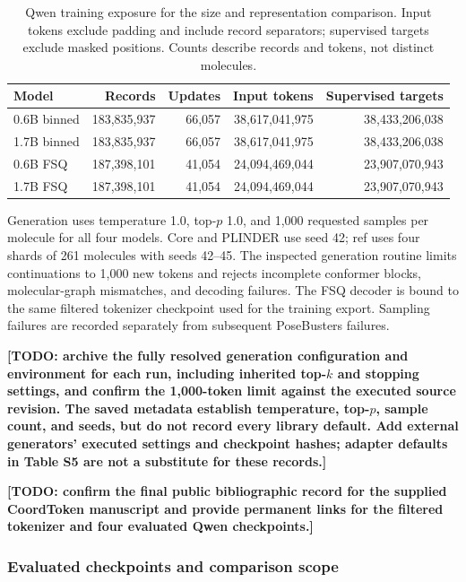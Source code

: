 \begin{table}[htbp]
\centering
\small
\setlength{\tabcolsep}{5pt}
\caption{Qwen training exposure for the size and representation comparison. Input tokens exclude padding and include record separators;
supervised targets exclude masked positions. Counts describe records and tokens,
not distinct molecules.}
\label{tab:qwen-training}
\begin{tabular}{lrrrr}
\toprule
Model & Records & Updates & Input tokens & Supervised targets \\
\midrule
0.6B binned & 183,835,937 & 66,057 & 38,617,041,975 & 38,433,206,038 \\
1.7B binned & 183,835,937 & 66,057 & 38,617,041,975 & 38,433,206,038 \\
0.6B FSQ & 187,398,101 & 41,054 & 24,094,469,044 & 23,907,070,943 \\
1.7B FSQ & 187,398,101 & 41,054 & 24,094,469,044 & 23,907,070,943 \\
\bottomrule
\end{tabular}
\end{table}

Generation uses temperature 1.0, top-$p$ 1.0, and 1,000 requested
samples per molecule for all four models. Core and PLINDER use seed 42; ref uses
four shards of 261 molecules with seeds 42--45. The inspected generation routine
limits continuations to 1,000 new tokens and rejects incomplete conformer blocks,
molecular-graph mismatches, and decoding failures. The FSQ decoder is bound to the
same filtered tokenizer checkpoint used for the training export. Sampling failures
are recorded separately from subsequent PoseBusters failures.

\textbf{[TODO: archive the fully resolved generation configuration and environment for
each run, including inherited top-$k$ and stopping settings, and confirm the
1,000-token limit against the executed source revision. The saved metadata establish
temperature, top-$p$, sample count, and seeds, but do not record every library default.
Add external generators' executed settings and checkpoint
hashes; adapter defaults in Table S5 are not a substitute for these records.]}

\textbf{[TODO: confirm the final public bibliographic record for the supplied CoordToken
manuscript and provide permanent links for the filtered tokenizer and four evaluated
Qwen checkpoints.]}

\subsubsection*{Evaluated checkpoints and comparison scope}

